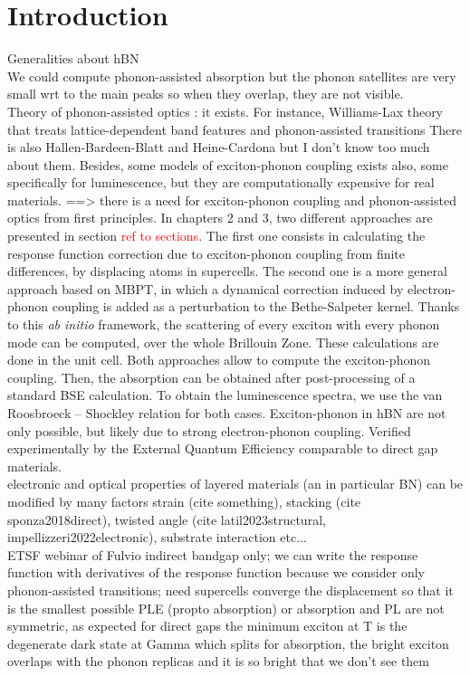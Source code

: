 \chapter*{Introduction}
Generalities about hBN \\
We could compute phonon-assisted absorption but the phonon satellites are very small wrt to the main peaks so when they overlap, they are not visible.\\
Theory of phonon-assisted optics : it exists. For instance, Williams-Lax theory that treats lattice-dependent band features and phonon-assisted transitions 
There is also Hallen-Bardeen-Blatt and Heine-Cardona but I don't know too much about them.
Besides, some models of exciton-phonon coupling exists also, some specifically for luminescence, but they are computationally expensive for real materials.
==> there is a need for exciton-phonon coupling and phonon-assisted optics from first principles. In chapters 2 and 3, two different approaches are presented in section \textcolor{red}{ref to sections}. The first one consists in calculating the response function correction due to exciton-phonon coupling from finite differences, by displacing atoms in supercells. The second one is a more general approach based on \acrshort{MBPT}, in which a dynamical correction induced by electron-phonon coupling is added as a perturbation to the Bethe-Salpeter kernel. Thanks to this \textit{ab initio} framework, the scattering of every exciton with every phonon mode can be computed, over the whole Brillouin Zone. These calculations are done in the unit cell.
Both approaches allow to compute the exciton-phonon coupling. Then, the absorption can be obtained after post-processing of a standard \acrshort{BSE} calculation. To obtain the luminescence spectra, we use the van Roosbroeck -- Shockley relation for both cases.
Exciton-phonon in hBN are not only possible, but likely due to strong electron-phonon coupling. Verified experimentally by the External Quantum Efficiency comparable to direct gap materials.\\

%
electronic and optical properties of layered materials (an in particular BN) can be modified by many factors
strain (cite something), stacking (cite sponza2018direct), twisted angle (cite latil2023structural, impellizzeri2022electronic), substrate interaction etc...\\

%
%
ETSF webinar of Fulvio
indirect bandgap only; we can write the response function with derivatives of the response function because we consider only phonon-assisted transitions; need supercells
converge the displacement so that it is the smallest possible
PLE (propto absorption) or absorption and PL are not symmetric, as expected for direct gaps
the minimum exciton at T is the degenerate dark state at Gamma which splits
for absorption, the bright exciton overlaps with the phonon replicas and it is so bright that we don't see them 